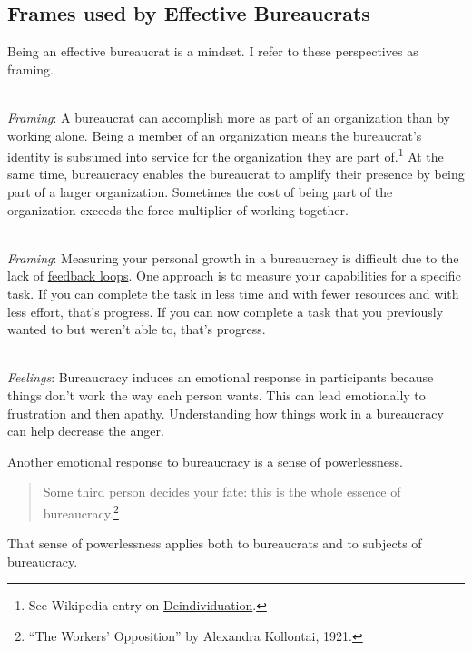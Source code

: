 \subsection*{Frames used by Effective Bureaucrats}

Being an effective bureaucrat is a mindset. I refer to these perspectives as framing. 

\ \\
\textit{Framing}: A bureaucrat can accomplish more as part of an organization than by working alone. Being a member of an organization means the bureaucrat's identity is subsumed into service for the organization they are part of.\footnote{See Wikipedia entry on \href{https://en.wikipedia.org/wiki/Deindividuation}{Deindividuation}.
} At the same time, bureaucracy enables the bureaucrat to amplify their presence by being part of a larger organization.  Sometimes the cost of being part of the organization exceeds the force multiplier of working together. 

\ \\
\textit{Framing}: Measuring your personal growth in a bureaucracy is difficult due to the lack of \hyperref[sec:feedback-loop-and-ripples]{feedback loops}. One approach is to measure your capabilities for a specific task. If you can complete the task in less time and with fewer resources and with less effort, that's progress. If you can now complete a task that you previously wanted to but weren't able to, that's progress.


\ \\
\textit{Feelings}: Bureaucracy induces an emotional response in participants because things don't work the way each person wants. This can lead emotionally to frustration and then apathy. Understanding how things work in a bureaucracy can help decrease the anger.


Another emotional response to bureaucracy is a sense of powerlessness. 
\begin{quote}
Some third person decides your fate: this is the whole essence of bureaucracy.\footnote{``The Workers' Opposition'' by Alexandra Kollontai, 1921.}
\end{quote}
That sense of powerlessness applies both to bureaucrats and to subjects of bureaucracy. 

